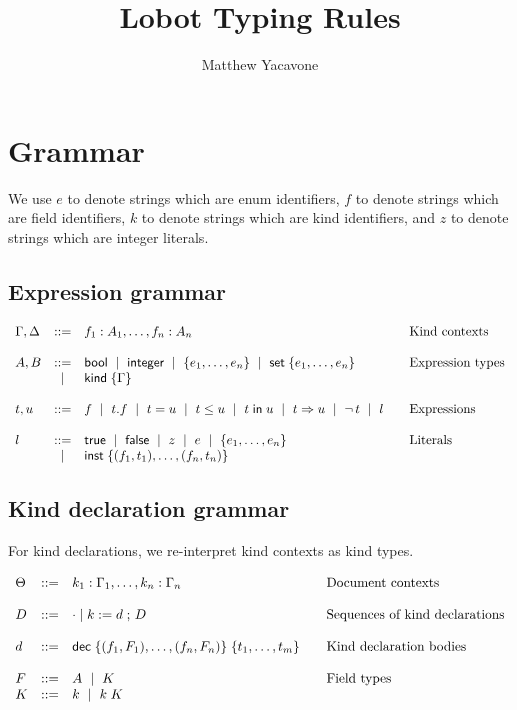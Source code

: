 \documentclass{article}
\title{Lobot Typing Rules}
\author{Matthew Yacavone}
\begin{document}
\maketitle

\section{Grammar}

We use $e$ to denote strings which are enum identifiers, $f$ to denote strings which are field identifiers, $k$ to denote strings which are kind identifiers, and $z$ to denote strings which are integer literals.

\subsection{Expression grammar}

\[ \begin{array}{lclll}
\exprCtx,\exprCtxAlt
    &::= & f_1 : A_1 , \ldots , f_n : A_n &&\text{Kind contexts} \\ \\
A,B &::= & \BB \| \ZZ \| \{ e_1 , \ldots , e_n \} \| \kw{set}\;\{ e_1 , \ldots , e_n \}
    &&\text{Expression types}  \\
    &\|  & \kw{kind}\;\{ \exprCtx \} \\ \\
t,u &::= & f \| %
           t.f \| t = u \| t \le u \| t \;\kw{in}\; u \| t \Rightarrow u \| \neg t \| l
    &&\text{Expressions} \\ \\
l   &::= & \kw{true} \| \kw{false} \| z \| e \| \{ e_1 , \ldots , e_n \}
    &&\text{Literals} \\
    &\|  & \kw{inst}\;\{ (f_1, t_1), \ldots, (f_n, t_n) \}
\end{array} \]

\subsection{Kind declaration grammar}

For kind declarations, we re-interpret kind contexts as kind types.

\[ \begin{array}{lclll}
\declCtx
    &::= & k_1 : \exprCtx_1, \ldots, k_n : \exprCtx_n
    &&\text{Document contexts} \\ \\
D   &::= & \cdot \mid k := d \;;\, D
    &&\text{Sequences of kind declarations} \\ \\
d   &::= & \kw{dec}\;\{ (f_1 , F_1) , \ldots , (f_n , F_n) \} \; \{ t_1 , \ldots , t_m \}
    &&\text{Kind declaration bodies} \\ \\
F   &::= & A \| K
    &&\text{Field types} \\ %
K   &::= & k \|  k\;K
\end{array} \]
\end{document}
